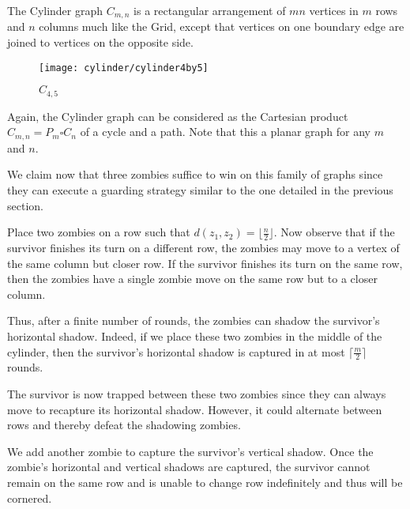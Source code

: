 
The Cylinder graph $C_{m,n}$ is a rectangular arrangement of $mn$ vertices in
$m$ rows and $n$ columns much like the Grid, except that vertices on one
boundary edge are joined to vertices on the opposite side.

\begin{figure}[h]
  \centering
  \texttt{[image: cylinder/cylinder4by5]}
  \caption{$C_{4,5}$ \label{fig:cylinder4by5}}
\end{figure}

Again, the Cylinder graph can be considered as the Cartesian product $C_{m,n} = P_m \square C_n$
of a cycle and a path. Note that this a planar graph for any $m$ and $n$.

We claim now that three zombies suffice to win on this family of graphs since they can execute
a guarding strategy similar to the one detailed in the previous section.

Place two zombies on a row such that $d(z_1, z_2) = \lfloor \frac{n}{2} \rfloor$.
Now observe that if the survivor finishes its turn on a different row, the zombies may move
to a vertex of the same column but closer row.
If the survivor finishes its turn on the same row, then the zombies have a single
zombie move on the same row but to a closer column.

Thus, after a finite number of rounds, the zombies can shadow the survivor's
horizontal shadow. Indeed, if we place these two zombies in the middle
of the cylinder, then the survivor's horizontal shadow is captured in at most
$\lceil \frac{m}{2} \rceil$ rounds.

The survivor is now trapped between these two zombies since they
can always move to recapture its horizontal shadow.
However, it could alternate between rows and thereby defeat the shadowing zombies.

We add another zombie to capture the survivor's vertical shadow.
Once the zombie's horizontal and vertical shadows are captured, the survivor
cannot remain on the same row and is unable to change row
indefinitely and thus will be cornered.
